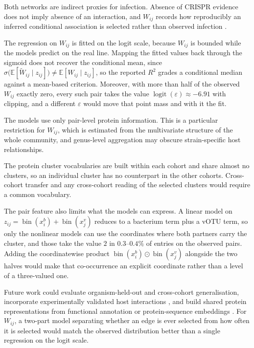 Both networks are indirect proxies for infection. Absence of CRISPR evidence does not imply absence of an
interaction, and \(W_{ij}\) records how reproducibly an inferred conditional association is selected
rather than observed infection \citep{coenen2018,pinto2022,alrasheed2019}.

The regression on \(W_{ij}\) is fitted on the logit scale, because \(W_{ij}\) is bounded while the models
predict on the real line. Mapping the fitted values back through the sigmoid does not recover the
conditional mean, since \(\sigma\bigl(\mathbb{E}[\widetilde W_{ij}\mid z_{ij}]\bigr)\neq
\mathbb{E}[W_{ij}\mid z_{ij}]\), so the reported \(R^{2}\) grades a conditional median against a
mean-based criterion. Moreover, with more than half of the observed
\(W_{ij}\) exactly zero, every such pair takes the value \(\operatorname{logit}(\varepsilon)\approx
-6.91\) with clipping, and a different \(\varepsilon\) would move that point mass and with it the fit. 

The models use only pair-level protein information. This is a particular restriction for \(W_{ij}\), which
is estimated from the multivariate structure of the whole community, and genus-level aggregation may
obscure strain-specific host relationships.

The protein cluster vocabularies are built within each cohort and share almost no clusters, so an
individual cluster has no counterpart in the other cohorts. Cross-cohort transfer and any cross-cohort
reading of the selected clusters would require a common vocabulary.

The pair feature also limits what the models can express. A linear model on
\(z_{ij}=\operatorname{bin}(x^{b}_{i})+\operatorname{bin}(x^{v}_{j})\) reduces to a bacterium term plus a
vOTU term, so only the nonlinear models can use the coordinates where both partners carry the cluster,
and those take the value \(2\) in \(0.3\)--\(0.4\%\) of entries on the observed pairs. Adding the coordinatewise product
\(\operatorname{bin}(x^{b}_{i})\odot\operatorname{bin}(x^{v}_{j})\) alongside the two halves would make
that co-occurrence an explicit coordinate rather than a level of a three-valued one.

Future work could evaluate organism-held-out and cross-cohort generalisation, incorporate experimentally
validated host interactions \citep{shang2025}, and build shared protein representations from functional
annotation or protein-sequence embeddings \citep{lin2023}. For \(W_{ij}\), a two-part model separating
whether an edge is ever selected from how often it is selected would match the observed distribution
better than a single regression on the logit scale.
